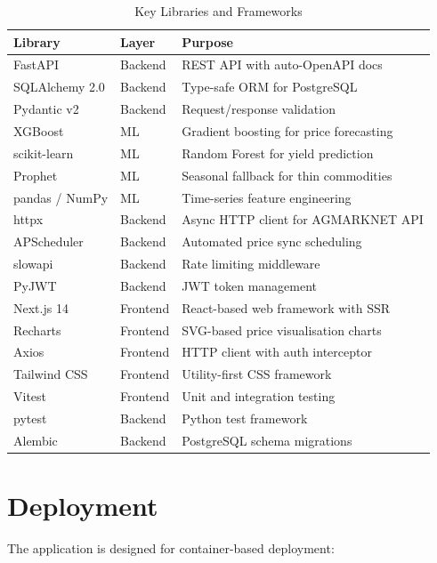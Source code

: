 \documentclass[12pt,a4paper]{report}
\begin{document}
\begin{table}[H]
\centering
\caption{Key Libraries and Frameworks}
\label{tab:libraries}
\begin{tabular}{|l|l|p{5cm}|}
\hline
\textbf{Library} & \textbf{Layer} & \textbf{Purpose} \\
\hline
FastAPI & Backend & REST API with auto-OpenAPI docs \\
SQLAlchemy 2.0 & Backend & Type-safe ORM for PostgreSQL \\
Pydantic v2 & Backend & Request/response validation \\
XGBoost & ML & Gradient boosting for price forecasting \\
scikit-learn & ML & Random Forest for yield prediction \\
Prophet & ML & Seasonal fallback for thin commodities \\
pandas / NumPy & ML & Time-series feature engineering \\
httpx & Backend & Async HTTP client for AGMARKNET API \\
APScheduler & Backend & Automated price sync scheduling \\
slowapi & Backend & Rate limiting middleware \\
PyJWT & Backend & JWT token management \\
Next.js 14 & Frontend & React-based web framework with SSR \\
Recharts & Frontend & SVG-based price visualisation charts \\
Axios & Frontend & HTTP client with auth interceptor \\
Tailwind CSS & Frontend & Utility-first CSS framework \\
Vitest & Frontend & Unit and integration testing \\
pytest & Backend & Python test framework \\
Alembic & Backend & PostgreSQL schema migrations \\
\hline
\end{tabular}
\end{table}

\section{Deployment}

The application is designed for container-based deployment:
\end{document}
